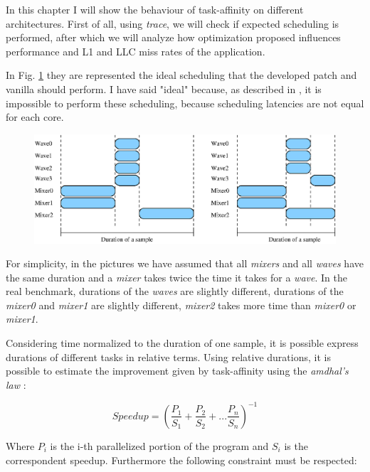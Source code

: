 In this chapter I will show the behaviour of task-affinity on different architectures. First of all, using \textit{trace}, we will check if expected 
scheduling is performed, after which we will analyze how optimization proposed influences performance and L1 and LLC miss rates of the application. 

In Fig. \ref{fig:ideal_scheduling} they are represented the ideal scheduling that the developed patch and vanilla should perform. 
I have said "ideal" because, as described in \cite{lcs}, it is impossible to perform these scheduling, because scheduling latencies are not equal for each 
core.

\begin{figure}[htbp]
\centering
\includegraphics[width=\widefigure]{images/schedule_van_taskaff.eps}
\caption{}
\label{fig:ideal_scheduling}
\end{figure}

For simplicity, in the pictures we have assumed that all \textit{mixers} and all \textit{waves} have the same duration and a \textit{mixer} takes twice the 
time it takes for a \textit{wave}. In the real benchmark, durations of the \textit{waves} are slightly different, durations of the \textit{mixer0} and 
\textit{mixer1} are slightly different, \textit{mixer2} takes more time than \textit{mixer0} or \textit{mixer1}.

Considering time normalized to the duration of one sample, it is possible express durations of different tasks in relative terms.
Using relative durations, it is possible to estimate the improvement given by task-affinity using the \textit{amdhal's law} \cite{lcs}:

\begin{equation}
       Speedup = \left(\frac{P_{1}}{S_{1}} + \frac{P_{2}}{S_{2}} + ... \frac{P_{n}}{S_{n}} \right)^{-1} 
\label{eq:amdhal}
\end{equation}

Where $P_{i}$ is the i-th parallelized portion of the program and $S_{i}$ is the correspondent speedup. Furthermore the following constraint must be 
respected:

